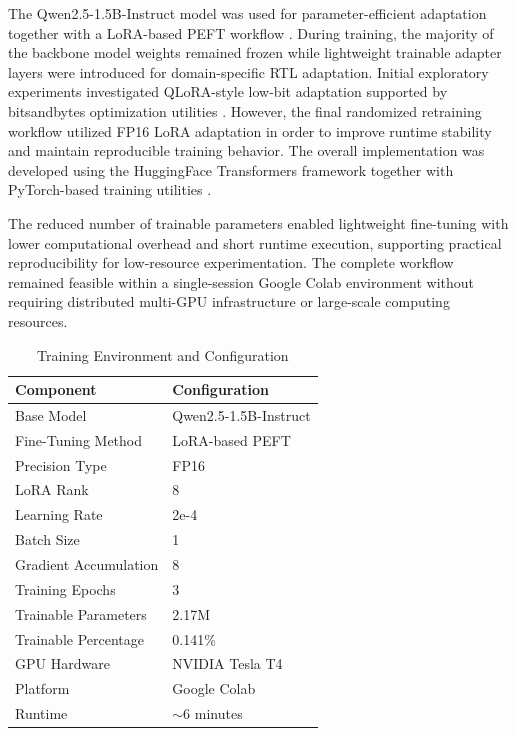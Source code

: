\documentclass[conference]{IEEEtran}
\begin{document}
The Qwen2.5-1.5B-Instruct model was used for parameter-efficient adaptation together with a LoRA-based PEFT workflow \cite{lora,peft}. During training, the majority of the backbone model weights remained frozen while lightweight trainable adapter layers were introduced for domain-specific RTL adaptation. Initial exploratory experiments investigated QLoRA-style low-bit adaptation supported by bitsandbytes optimization utilities \cite{qlora,bitsandbytes}. However, the final randomized retraining workflow utilized FP16 LoRA adaptation in order to improve runtime stability and maintain reproducible training behavior. The overall implementation was developed using the HuggingFace Transformers framework together with PyTorch-based training utilities \cite{wolf2020transformers,pytorch}.

The reduced number of trainable parameters enabled lightweight fine-tuning with lower computational overhead and short runtime execution, supporting practical reproducibility for low-resource experimentation. The complete workflow remained feasible within a single-session Google Colab environment without requiring distributed multi-GPU infrastructure or large-scale computing resources.

\begin{table}[!t]
\caption{Training Environment and Configuration}
\label{tab:training_environment}
\centering
\begin{tabular}{ll}
\toprule
Component & Configuration \\
\midrule
Base Model & Qwen2.5-1.5B-Instruct \\
Fine-Tuning Method & LoRA-based PEFT \\
Precision Type & FP16 \\
LoRA Rank & 8 \\
Learning Rate & 2e-4 \\
Batch Size & 1 \\
Gradient Accumulation & 8 \\
Training Epochs & 3 \\
Trainable Parameters & 2.17M \\
Trainable Percentage & 0.141\% \\
GPU Hardware & NVIDIA Tesla T4 \\
Platform & Google Colab \\
Runtime & $\sim$6 minutes \\
\bottomrule
\end{tabular}
\end{table}
\end{document}
